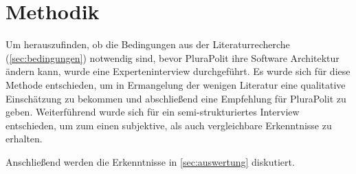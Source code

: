 \section{Methodik}
\label{sec:methodik}


Um herauszufinden, ob die Bedingungen aus der Literaturrecherche (\cref{sec:bedingungen}) notwendig sind, bevor PluraPolit ihre Software Architektur ändern kann, wurde eine Experteninterview durchgeführt. Es wurde sich für diese Methode entschieden, um in Ermangelung der wenigen Literatur eine qualitative Einschätzung zu bekommen und abschließend eine Empfehlung für PluraPolit zu geben. Weiterführend wurde sich für ein semi-strukturiertes Interview entschieden, um zum einen subjektive, als auch vergleichbare Erkenntnisse zu erhalten.

Anschließend werden die Erkenntnisse in \cref{sec:auswertung} diskutiert.







